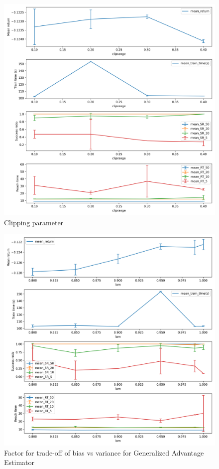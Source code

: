 \documentclass{article}
\begin{document}
\begin{figure}[H]
    \centering
    \includegraphics[width=\textwidth]{../ppo2_cliprange.png}
\caption{Clipping parameter}
\end{figure}

\begin{figure}[H]
    \centering
    \includegraphics[width=\textwidth]{../ppo2_lam.png}
\caption{Factor for trade-off of bias vs variance for Generalized Advantage Estimator}
\end{figure}
\end{document}
